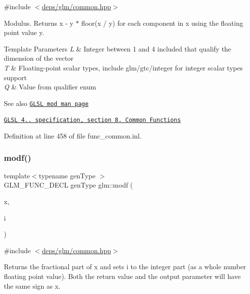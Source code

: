 {\ttfamily \#include $<$\hyperlink{common_8hpp}{deps/glm/common.\+hpp}$>$}

Modulus. Returns x -\/ y $\ast$ floor(x / y) for each component in x using the floating point value y.


\begin{DoxyTemplParams}{Template Parameters}
{\em L} & Integer between 1 and 4 included that qualify the dimension of the vector \\
\hline
{\em T} & Floating-\/point scalar types, include glm/gtc/integer for integer scalar types support \\
\hline
{\em Q} & Value from qualifier enum\\
\hline
\end{DoxyTemplParams}
\begin{DoxySeeAlso}{See also}
\href{http://www.opengl.org/sdk/docs/manglsl/xhtml/mod.xml}{\tt G\+L\+SL mod man page} 

\href{http://www.opengl.org/registry/doc/GLSLangSpec.4.20.8.pdf}{\tt G\+L\+SL 4.. specification, section 8. Common Functions} 
\end{DoxySeeAlso}


Definition at line 458 of file func\+\_\+common.\+inl.

\mbox{\label{group__core__func__common_ga85e33f139b8db1b39b590a5713b9e679}} 
\subsubsection{\texorpdfstring{modf()}{modf()}}
{\footnotesize\ttfamily template$<$typename gen\+Type $>$ \\
G\+L\+M\+\_\+\+F\+U\+N\+C\+\_\+\+D\+E\+CL gen\+Type glm\+::modf (\begin{DoxyParamCaption}\item[{gen\+Type}]{x,  }\item[{gen\+Type \&}]{i }\end{DoxyParamCaption})}



{\ttfamily \#include $<$\hyperlink{common_8hpp}{deps/glm/common.\+hpp}$>$}

Returns the fractional part of x and sets i to the integer part (as a whole number floating point value). Both the return value and the output parameter will have the same sign as x.


